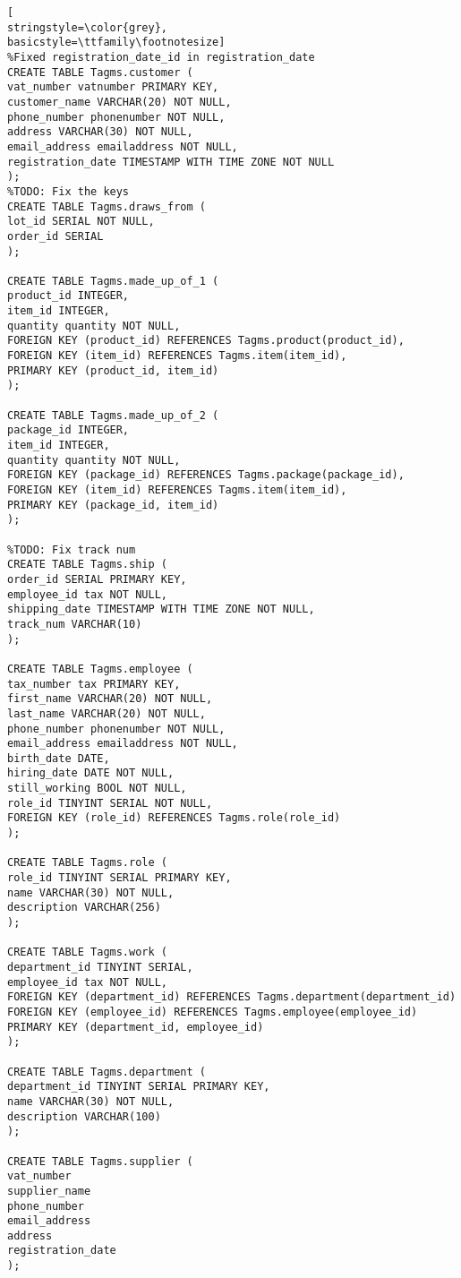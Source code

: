 \begin{lstlisting}[
stringstyle=\color{grey},
basicstyle=\ttfamily\footnotesize]
%Fixed registration_date_id in registration_date
CREATE TABLE Tagms.customer (
vat_number vatnumber PRIMARY KEY,
customer_name VARCHAR(20) NOT NULL,
phone_number phonenumber NOT NULL,
address VARCHAR(30) NOT NULL,
email_address emailaddress NOT NULL,
registration_date TIMESTAMP WITH TIME ZONE NOT NULL
);
%TODO: Fix the keys
CREATE TABLE Tagms.draws_from (
lot_id SERIAL NOT NULL,
order_id SERIAL
);

CREATE TABLE Tagms.made_up_of_1 (
product_id INTEGER,
item_id INTEGER,
quantity quantity NOT NULL,
FOREIGN KEY (product_id) REFERENCES Tagms.product(product_id),
FOREIGN KEY (item_id) REFERENCES Tagms.item(item_id),
PRIMARY KEY (product_id, item_id)
);

CREATE TABLE Tagms.made_up_of_2 (
package_id INTEGER,
item_id INTEGER,
quantity quantity NOT NULL,
FOREIGN KEY (package_id) REFERENCES Tagms.package(package_id),
FOREIGN KEY (item_id) REFERENCES Tagms.item(item_id),
PRIMARY KEY (package_id, item_id)
);

%TODO: Fix track num
CREATE TABLE Tagms.ship (
order_id SERIAL PRIMARY KEY,
employee_id tax NOT NULL,
shipping_date TIMESTAMP WITH TIME ZONE NOT NULL,
track_num VARCHAR(10)
);

CREATE TABLE Tagms.employee (
tax_number tax PRIMARY KEY,
first_name VARCHAR(20) NOT NULL,
last_name VARCHAR(20) NOT NULL,
phone_number phonenumber NOT NULL,
email_address emailaddress NOT NULL,
birth_date DATE,
hiring_date DATE NOT NULL,
still_working BOOL NOT NULL,
role_id TINYINT SERIAL NOT NULL,
FOREIGN KEY (role_id) REFERENCES Tagms.role(role_id)
);

CREATE TABLE Tagms.role (
role_id TINYINT SERIAL PRIMARY KEY,
name VARCHAR(30) NOT NULL,
description VARCHAR(256)
);

CREATE TABLE Tagms.work (
department_id TINYINT SERIAL,
employee_id tax NOT NULL,
FOREIGN KEY (department_id) REFERENCES Tagms.department(department_id)
FOREIGN KEY (employee_id) REFERENCES Tagms.employee(employee_id)
PRIMARY KEY (department_id, employee_id)
);

CREATE TABLE Tagms.department (
department_id TINYINT SERIAL PRIMARY KEY,
name VARCHAR(30) NOT NULL,
description VARCHAR(100)
);

CREATE TABLE Tagms.supplier (
vat_number
supplier_name
phone_number
email_address
address
registration_date
);

\end{lstlisting}